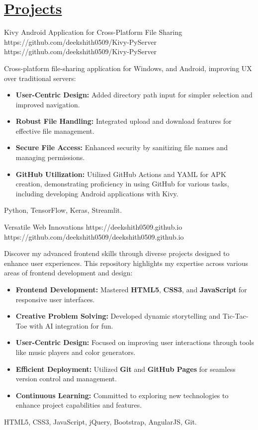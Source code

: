 \documentclass[a4paper,10pt]{article}
\begin{document}
\section{ \href{https://github.com/deekshith0509?tab=repositories}{Projects}}
\vspace{0pt}
\projectentry
{Kivy Android Application for Cross-Platform File Sharing}
{https://github.com/deekshith0509/Kivy-PyServer}
{https://github.com/deekshith0509/Kivy-PyServer}
{Cross-platform file-sharing application for Windows, and Android, improving UX over traditional servers:
\begin{itemize}
    \item \textbf{User-Centric Design:} Added directory path input for simpler selection and improved navigation.
    \item \textbf{Robust File Handling:} Integrated upload and download features for effective file management.
    \item \textbf{Secure File Access:} Enhanced security by sanitizing file names and managing permissions.
    \item \textbf{GitHub Utilization:} Utilized GitHub Actions and YAML for APK creation, demonstrating proficiency in using GitHub for various tasks, including developing Android applications with Kivy.
\end{itemize}}{Python, TensorFlow, Keras, Streamlit.}

\vspace{10pt}
\projectentry
{Versatile Web Innovations}
{https://deekshith0509.github.io}
{https://github.com/deekshith0509/deekshith0509.github.io}
{Discover my advanced frontend skills through diverse projects designed to enhance user experiences. This repository highlights my expertise across various areas of frontend development and design:
\begin{itemize}
\item \textbf{Frontend Development:} Mastered \textbf{HTML5}, \textbf{CSS3}, and \textbf{JavaScript} for responsive user interfaces.
\item \textbf{Creative Problem Solving:} Developed dynamic storytelling and Tic-Tac-Toe with AI integration for fun.
\item \textbf{User-Centric Design:} Focused on improving user interactions through tools like music players and color generators.
\item \textbf{Efficient Deployment:} Utilized \textbf{Git} and \textbf{GitHub Pages} for seamless version control and management.
\item \textbf{Continuous Learning:} Committed to exploring new technologies to enhance project capabilities and features.
\end{itemize}
}{HTML5, CSS3, JavaScript, jQuery, Bootstrap, AngularJS, Git.}
\end{document}
